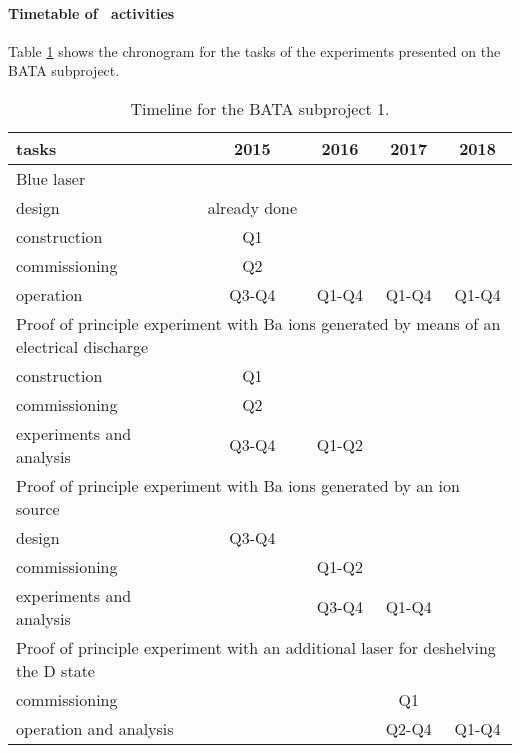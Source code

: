 \paragraph{Timetable of \BATA\ activities}
Table \ref{tab:schedule_calibration} shows the chronogram for the tasks of the experiments presented on the BATA subproject. 

\begin{table}
\begin{center}
\begin{tabular}{| l | c | c | c | c |}
\hline
tasks & 2015 & 2016 & 2017 & 2018 \\
\hline
\hline
\multicolumn{5}{|l|}{Blue laser}  \\
\hline
\hline
design & already done & & &  \\
construction & Q1 & & & \\
commissioning & Q2& & & \\
operation &  Q3-Q4 & Q1-Q4 &  Q1-Q4&  Q1-Q4\\
\hline
\hline
\multicolumn{5}{|l|}{Proof of principle experiment with Ba ions generated by means of an electrical discharge}  \\
\hline
\hline
construction  &  Q1 & & & \\
commissioning &  Q2 & & & \\
experiments and analysis &  Q3-Q4 & Q1-Q2& & \\
\hline
\hline
\multicolumn{5}{|l|}{Proof of principle experiment with Ba ions generated by an ion source}  \\
\hline
\hline
design & Q3-Q4 & & &  \\
commissioning  &  & Q1-Q2& & \\
experiments and analysis &  & Q3-Q4 & Q1-Q4 & \\
\hline
\hline
\multicolumn{5}{|l|}{Proof of principle experiment with an additional laser for deshelving the D state}  \\
\hline
\hline
commissioning  &  &  & Q1 & \\
operation and analysis &  &  & Q2-Q4 & Q1-Q4 \\
\hline
\hline
\end{tabular}
\caption{Timeline for the BATA subproject 1.}
\label{tab:schedule_calibration}
\end{center}


\end{table}
